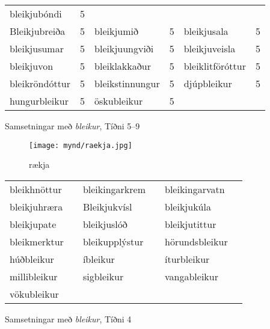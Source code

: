 \documentclass[../samsetningasafn.tex]{subfiles}
\begin{document}
\begin{wordlist}[H]
\begin{tcolorbox}
\begin{tabular}{BlBlBl}
		bleikjubóndi		& 5		\\ 
		Bleikjubreiða		& 5		& 
		bleikjumið		& 5		& 	
		bleikjusala		& 5		\\ 	
		bleikjusumar		& 5		& 
		bleikjuungviði	& 5		& 	
		bleikjuveisla		& 5		\\ 
		bleikjuvon		& 5		& 	
		bleiklakkaður		& 5		& 
		bleiklitföróttur	& 5		\\ 	
		bleikröndóttur	& 5		& 	
		bleikstinnungur	& 5		& 	
		djúpbleikur		& 5		\\ 	
		hungurbleikur	& 5		& 	
		öskubleikur		& 5		& 	
						&
	\end{tabular}

\end{tcolorbox}
	\caption{Samsetningar með \textit{bleikur}, Tíðni 5--9}
	\label{listi:bleikt.5}
\end{wordlist}

\begin{figure}[H]
\begin{tcolorbox}
\centering
	\texttt{[image: mynd/raekja.jpg]}
\end{tcolorbox}
	\caption{rækja}
	\label{mynd:raekja}
\end{figure}	

\begin{wordlist}[H]
\begin{tcolorbox}
	\setlength{\extrarowheight}{3pt}
	\begin{tabular}{BlBlBl}	
		bleikhnöttur		& 		& 		
		bleikingarkrem	& 		& 		
		bleikingarvatn	&		\\ 		
		bleikjuhræra		& 		& 		
		Bleikjukvísl		&		& 		
		bleikjukúla		&		\\ 		
		bleikjupate		&		& 		
		bleikjuslóð		&		& 		
		bleikjutittur		&		\\ 		
		bleikmerktur		&		& 		
		bleikupplýstur	&		& 		
		hörundsbleikur	&		\\ 	
		húðbleikur		&		& 	
		íbleikur			&		& 	
		íturbleikur		&		\\ 		
		millibleikur		&		& 	
		sigbleikur		&		& 		
		vangableikur		&		\\ 	
		vökubleikur		&		&  	
						&		&
						&
	\end{tabular}

\end{tcolorbox}
	\caption{Samsetningar með \textit{bleikur}, Tíðni 4}
	\label{listi:bleikt.4}
\end{wordlist}
\end{document}
